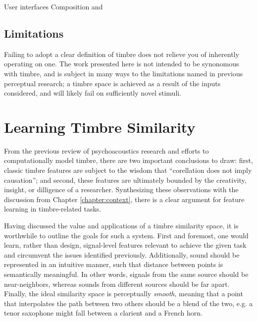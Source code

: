 User interfaces
Composition and

\subsection{Limitations}
Failing to adopt a clear definition of timbre does not relieve you of inherently operating on one.
The work presented here is not intended to be synonomous with timbre, and is subject in many ways to the limitations named in previous perceptual research; a timbre space is achieved as a result of the inputs considered, and will likely fail on sufficiently novel stimuli.


\section{Learning Timbre Similarity}
\label{sec:timbre_embedding}

From the previous review of psychoacoustics research and efforts to computationally model timbre, there are two important conclusions to draw:
first, classic timbre features are subject to the wisdom that ``corellation does not imply causation'';
and second, these features are ultimately bounded by the creativity, insight, or dilligence of a researcher.
Synthesizing these observations with the discussion from Chapter \ref{chapter:context}, there is a clear argument for feature learning in timbre-related tasks.

Having discussed the value and applications of a timbre similarity space, it is worthwhile to outline the goals for such a system.
First and foremost, one would learn, rather than design, signal-level features relevant to achieve the given task and circumvent the issues identified previously.
Additionally, sound should be represented in an intuitive manner, such that distance between points is semantically meaningful.
In other words, signals from the same source should be near-neighbors, whereas sounds from different sources should be far apart.
Finally, the ideal similarity space is perceptually \emph{smooth}, meaning that a point that interpolates the path between two others should be a blend of the two, e.g. a tenor saxophone might fall between a clarient and a French horn.

